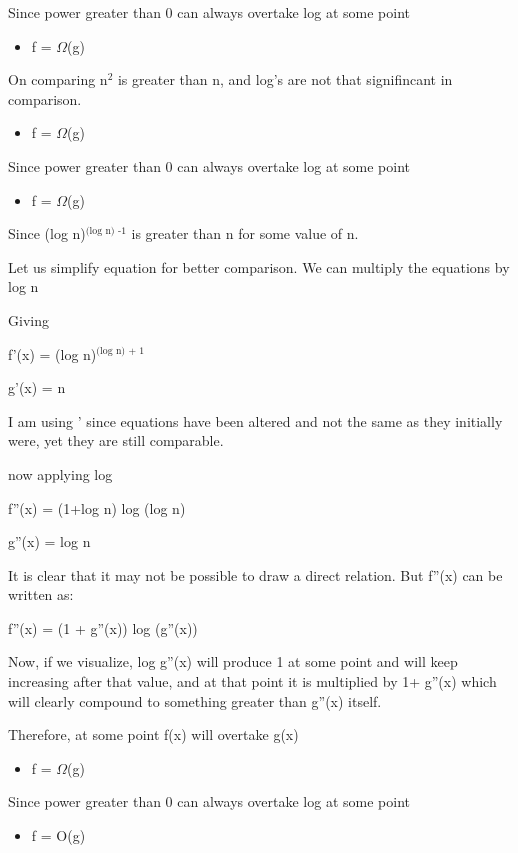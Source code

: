 \documentclass{book}
\begin{document}
Since power greater than 0 can always overtake log at some point
\begin{itemize}
\item f = \(\Omega\)(g)
\end{itemize}

On comparing n\(^{\text{2}}\) is greater than n, and log's are not that signifincant in comparison.
\begin{itemize}
\item f = \(\Omega\)(g)
\end{itemize}

Since power greater than 0 can always overtake log at some point
\begin{itemize}
\item f = \(\Omega\)(g)
\end{itemize}

Since (log n)\(^{\text{(log n) -1}}\) is greater than n for some value of n.
\begin{EQUATION}
Let us simplify equation for better comparison. We can multiply the equations by log n

Giving

f'(x) = (log n)\(^{\text{(log n) + 1}}\)

g'(x) =  n

I am using ' since equations have been altered and not the same as they initially were, yet they are still comparable.

now applying log

f''(x) = (1+log n) log (log n)

g''(x) = log n

It is clear that it may not be possible to draw a direct relation. But f''(x) can be written as:

f''(x) = (1 + g''(x)) log (g''(x))

Now, if we visualize, log g''(x) will produce 1 at some point and will keep increasing after that value, and at that point it is multiplied by 1+ g''(x) which will clearly compound to something greater than g''(x) itself.

Therefore, at some point f(x) will overtake g(x)
\end{EQUATION}
\begin{itemize}
\item f = \(\Omega\)(g)
\end{itemize}

Since power greater than 0 can always overtake log at some point
\begin{itemize}
\item f = O(g)
\end{itemize}
\end{document}
